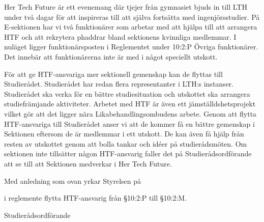 \documentclass[../_main/handlingar.tex]{subfiles}
\begin{document}

Her Tech Future är ett evenemang där tjejer från gymnasiet bjuds in till LTH under två dagar för att inspireras till att själva fortsätta med ingenjörsstudier. På E-sektionen har vi två funktionärer som arbetar med att hjälpa till att arrangera HTF och att rekrytera phaddrar bland sektionens kvinnliga medlemmar. I nuläget ligger funktionärsposten i Reglementet under 10:2:P Övriga funktionärer. Det innebär att funktionärerna inte är med i något speciellt utskott. 

För att ge HTF-ansvariga mer sektionell gemenskap kan de flyttas till Studierådet. Studierådet har redan flera representanter i LTH:s instanser. Studierådet ska verka för en bättre studiesituation och utskottet ska arrangera studiefrämjande aktiviteter. Arbetet med HTF är även ett jämställdshetsprojekt vilket gör att det ligger nära Likabehandlingsombudens arbete. Genom att flytta HTF-ansvariga till Studierådet anser vi att de kommer få en bättre gemenskap i Sektionen eftersom de är medlemmar i ett utskott. De kan även få hjälp från resten av utskottet genom att bolla tankar och idéer på studierådsmöten. Om sektionen inte tillsätter någon HTF-ansvarig faller det på Studierådsordförande att se till att Sektionen medverkar i Her Tech Future.

Med anledning som ovan yrkar Styrelsen på
\begin{attsatser}
    \att i reglemente flytta HTF-ansvarig från \S10:2:P till \S10:2:M.
\end{attsatser}

\begin{signatures}{1}
    \ist
\signature{Fanny Månefjord}{Studierådsordförande}
\end{signatures}
\end{document}
